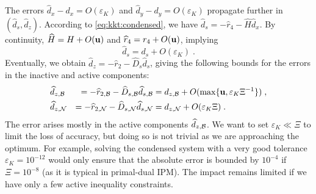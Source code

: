 The errors $\widehat{d}_x - d_x = O(\varepsilon_K)$ and
$\widehat{d}_y - d_y = O(\varepsilon_K)$ propagate further in $(\widehat{d}_s, \widehat{d}_z)$.
According to \eqref{eq:kkt:condensed}, we have $\widehat{d}_s = - \widehat{r}_4 - \widehat{H} \widehat{d}_x$.
By continuity, $\widehat{H} = H + O(\mathbf{u})$ and $\widehat{r}_4 = r_4 + O(\mathbf{u})$, implying
\begin{equation}
  \widehat{d}_s = d_s + O(\varepsilon_K) \; .
\end{equation}
Eventually, we obtain $\widehat{d}_z = - \widehat{r}_2 - \widehat{D}_s \widehat{d}_s$,
giving the following bounds for the errors in the inactive and active components:
\begin{equation}
  \begin{aligned}
    & \widehat{d}_{z,\mathcal{B}} &= -\widehat{r}_{2,\mathcal{B}} - \widehat{D}_{s,\mathcal{B}} \widehat{d}_{s,\mathcal{B}}
    &= d_{z,\mathcal{B}} + O(\max\{\mathbf{u}, \varepsilon_K \Xi^{-1}\}) \;,\\
                             & \widehat{d}_{z,\mathcal{N}} &= -\widehat{r}_{2,\mathcal{N}} - \widehat{D}_{s,\mathcal{N}} \widehat{d}_{s,\mathcal{N}}
                               &= d_{z,\mathcal{N}} + O(\varepsilon_K \Xi) \; .
  \end{aligned}
\end{equation}
The error arises mostly in the active components $\widehat{d}_{z,\mathcal{B}}$.
We want to set $\varepsilon_K \ll \Xi$ to limit the loss of accuracy, but doing
so is not trivial as we are approaching the optimum. For example,
solving the condensed system with a very good tolerance $\varepsilon_K = 10^{-12}$
would only ensure that the absolute error is bounded by $10^{-4}$ if $\Xi = 10^{-8}$
(as it is typical in primal-dual IPM). The impact remains limited if we
have only a few active inequality constraints.


